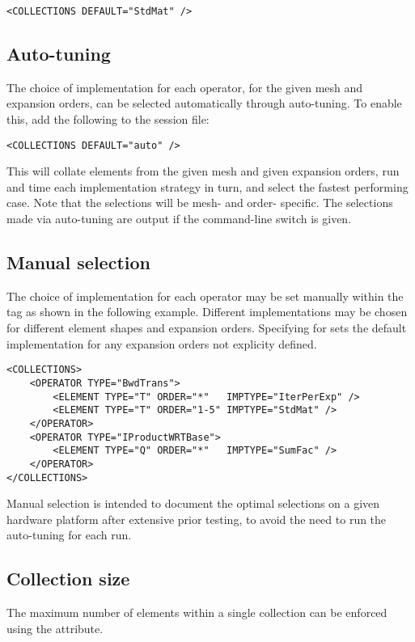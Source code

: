 \begin{lstlisting}[style=XmlStyle]
<COLLECTIONS DEFAULT="StdMat" />
\end{lstlisting}

\subsection{Auto-tuning}
The choice of implementation for each operator, for the given mesh and
expansion orders, can be selected automatically through 
auto-tuning. To enable this, add the following to the \nekpp session
file:

\begin{lstlisting}[style=XmlStyle]
<COLLECTIONS DEFAULT="auto" />
\end{lstlisting}

This will collate elements from the given mesh and given expansion orders,
run and time each implementation strategy in turn, and select the fastest
performing case. Note that the selections will be mesh- and order- specific.
The selections made via auto-tuning are output if the 
command-line switch is given.

\subsection{Manual selection}
The choice of implementation for each operator may be set manually within the
 tag as shown in the following example. Different implementations may be chosen for different element shapes and expansion orders.
Specifying \inltt{*} for  sets the default implementation for any
expansion orders not explicity defined.
\begin{lstlisting}[style=XmlStyle]
<COLLECTIONS>
    <OPERATOR TYPE="BwdTrans">
        <ELEMENT TYPE="T" ORDER="*"   IMPTYPE="IterPerExp" />
        <ELEMENT TYPE="T" ORDER="1-5" IMPTYPE="StdMat" />
    </OPERATOR>
    <OPERATOR TYPE="IProductWRTBase">
        <ELEMENT TYPE="Q" ORDER="*"   IMPTYPE="SumFac" />
    </OPERATOR>
</COLLECTIONS>
\end{lstlisting}

Manual selection is intended to document the optimal selections on a given
hardware platform after extensive prior testing, to avoid the need to run the
auto-tuning for each run.

\subsection{Collection size}
The maximum number of elements within a single collection can be enforced using
the  attribute.

